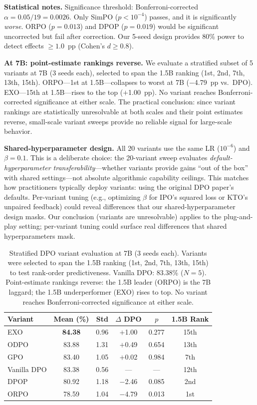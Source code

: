 \documentclass{article}
\begin{document}
\textbf{Statistical notes.} Significance threshold: Bonferroni-corrected $\alpha = 0.05/19 = 0.0026$. Only SimPO ($p < 10^{-4}$) passes, and it is significantly \emph{worse}. ORPO ($p = 0.013$) and DPOP ($p = 0.019$) would be significant uncorrected but fail after correction. Our 5-seed design provides 80\% power to detect effects $\geq 1.0$~pp (Cohen's $d \geq 0.8$).

\textbf{At 7B: point-estimate rankings reverse.} We evaluate a stratified subset of 5 variants at 7B (3 seeds each), selected to span the 1.5B ranking (1st, 2nd, 7th, 13th, 15th). ORPO---1st at 1.5B---collapses to worst at 7B ($-$4.79~pp vs.\ DPO). EXO---15th at 1.5B---rises to the top ($+$1.00~pp). No variant reaches Bonferroni-corrected significance at either scale. The practical conclusion: since variant rankings are statistically unresolvable at both scales and their point estimates reverse, small-scale variant sweeps provide no reliable signal for large-scale behavior.

\textbf{Shared-hyperparameter design.} All 20 variants use the same LR ($10^{-6}$) and $\beta = 0.1$. This is a deliberate choice: the 20-variant sweep evaluates \emph{default-hyperparameter transferability}---whether variants provide gains ``out of the box'' with shared settings---not absolute algorithmic capability ceilings. This matches how practitioners typically deploy variants: using the original DPO paper's defaults. Per-variant tuning (e.g., optimizing $\beta$ for IPO's squared loss or KTO's unpaired feedback) could reveal differences that our shared-hyperparameter design masks. Our conclusion (variants are unresolvable) applies to the plug-and-play setting; per-variant tuning could surface real differences that shared hyperparameters mask.

\begin{table}[ht]
\centering
\caption{Stratified DPO variant evaluation at 7B (3 seeds each). Variants were selected to span the 1.5B ranking (1st, 2nd, 7th, 13th, 15th) to test rank-order predictiveness. Vanilla DPO: 83.38\% ($N{=}5$). Point-estimate rankings reverse: the 1.5B leader (ORPO) is the 7B laggard; the 1.5B underperformer (EXO) rises to top. No variant reaches Bonferroni-corrected significance at either scale.}
\label{tab:dpo_variant_7b}
\small
\begin{tabular}{@{}lccccc@{}}
\toprule
\textbf{Variant} & \textbf{Mean (\%)} & \textbf{Std} & \textbf{$\Delta$ DPO} & \textbf{$p$} & \textbf{1.5B Rank} \\
\midrule
EXO & \textbf{84.38} & 0.96 & $+$1.00 & 0.277 & 15th \\
ODPO & 83.88 & 1.31 & $+$0.49 & 0.654 & 13th \\
GPO & 83.40 & 1.05 & $+$0.02 & 0.984 & 7th \\
Vanilla DPO & 83.38 & 0.56 & --- & --- & 12th \\
DPOP & 80.92 & 1.18 & $-$2.46 & 0.085 & 2nd \\
ORPO & 78.59 & 1.04 & $-$4.79 & 0.013 & 1st \\
\bottomrule
\end{tabular}
\end{table}
\end{document}
